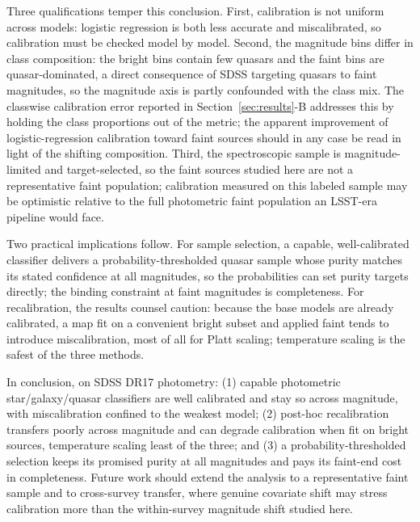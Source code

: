\documentclass[conference]{IEEEtran}
\begin{document}
Three qualifications temper this conclusion. First, calibration is not uniform across models: logistic regression is both less accurate and miscalibrated, so calibration must be checked model by model. Second, the magnitude bins differ in class composition: the bright bins contain few quasars and the faint bins are quasar-dominated, a direct consequence of SDSS targeting quasars to faint magnitudes, so the magnitude axis is partly confounded with the class mix. The classwise calibration error reported in Section~\ref{sec:results}-B addresses this by holding the class proportions out of the metric; the apparent improvement of logistic-regression calibration toward faint sources should in any case be read in light of the shifting composition. Third, the spectroscopic sample is magnitude-limited and target-selected, so the faint sources studied here are not a representative faint population; calibration measured on this labeled sample may be optimistic relative to the full photometric faint population an LSST-era pipeline would face.

Two practical implications follow. For sample selection, a capable, well-calibrated classifier delivers a probability-thresholded quasar sample whose purity matches its stated confidence at all magnitudes, so the probabilities can set purity targets directly; the binding constraint at faint magnitudes is completeness. For recalibration, the results counsel caution: because the base models are already calibrated, a map fit on a convenient bright subset and applied faint tends to introduce miscalibration, most of all for Platt scaling; temperature scaling is the safest of the three methods.

In conclusion, on SDSS DR17 photometry: (1) capable photometric star/galaxy/quasar classifiers are well calibrated and stay so across magnitude, with miscalibration confined to the weakest model; (2) post-hoc recalibration transfers poorly across magnitude and can degrade calibration when fit on bright sources, temperature scaling least of the three; and (3) a probability-thresholded selection keeps its promised purity at all magnitudes and pays its faint-end cost in completeness. Future work should extend the analysis to a representative faint sample and to cross-survey transfer, where genuine covariate shift may stress calibration more than the within-survey magnitude shift studied here.
\end{document}
